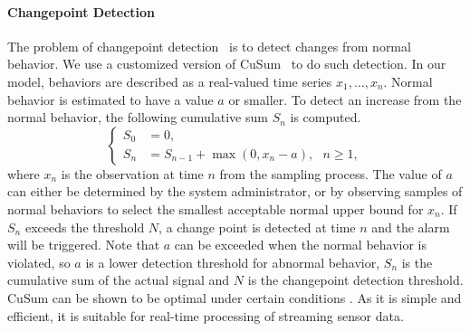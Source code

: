 \paragraph{Changepoint Detection}
\label{sec:sensor-changepoint}

\begin{table}[tb]
  \centering
  \noindent{}
  \caption{Overview of malware detection rules using changepoint detection. }\label{tbl:detect-malware}
\end{table}

The problem of changepoint detection~\cite{basseville1993detection} is to
detect changes from normal behavior.
We use a customized version of CuSum~\cite{page1954continuous} to do such
detection. In our model, behaviors are described as a real-valued
time series $x_1, \ldots, x_n$. Normal behavior is estimated to have a value
$a$ or smaller. To detect an
increase from the normal behavior,
the following cumulative sum $S_n$ is computed.
\begin{displaymath}
\left\{
\begin{aligned}
S_0 &= 0, \\
S_n &= S_{n-1} + \max(0, x_{n} - a), \ \ \ n \geq 1,
\end{aligned}
\right.
\end{displaymath}
\noindent where $x_n$ is the observation at time $n$ from the
sampling process. The value of $a$ can either be determined by the system
administrator, or by observing samples of normal behaviors to select
the smallest acceptable normal upper bound for $x_n$. If $S_n$
exceeds the threshold $N$, a change point is detected at time $n$
and the alarm will be triggered. Note that $a$ can be exceeded when
the normal behavior is violated, so $a$ is a lower detection threshold
for abnormal behavior, $S_n$ is the cumulative sum
of the actual signal and $N$ is the
changepoint detection threshold. CuSum can be shown to be optimal
under certain conditions \cite{basseville1993detection}. As it is simple
and efficient, it is suitable for real-time processing of streaming
sensor data.

